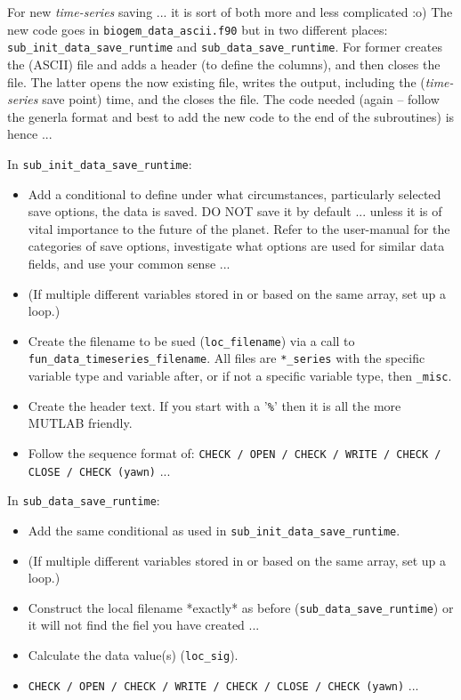 \documentclass[11pt,fleqn]{book} %
\begin{document}
For new \textit{time-series} saving ... it is sort of both more and less complicated :o) The new code goes in \texttt{biogem\_data\_ascii.f90} but in two different places: \texttt{sub\_init\_data\_save\_runtime} and \texttt{sub\_data\_save\_runtime}. For former creates the (ASCII) file and adds a header (to define the columns), and then closes the file. The latter opens the now existing file, writes the output, including the (\textit{time-series} save point) time, and the closes the file. The code needed (again -- follow the generla format and best to add the new code to the end of the subroutines) is hence ...

\noindent In \texttt{sub\_init\_data\_save\_runtime}:
\begin{itemize}[noitemsep]
\item Add a conditional to define under what circumstances, particularly selected save options, the data is saved. DO NOT save it by default ... unless it is of vital importance to the future of the planet. Refer to the user-manual for the categories of save options, investigate what options are used for similar data fields, and use your common sense ...
\item (If multiple different variables stored in or based on the same array, set up a loop.) 
\item Create the filename to be sued (\texttt{loc\_filename}) via a call to \texttt{fun\_data\_timeseries\_filename}. All files are \texttt{*\_series} with the specific variable type and variable after, or if not a specific variable type, then \texttt{\_misc}.
\item Create the header text. If you start with a '\texttt{\%}' then it is all the more MUTLAB friendly.
\item Follow the sequence format of: \texttt{CHECK / OPEN / CHECK / WRITE / CHECK / CLOSE / CHECK (yawn)} ...
\end{itemize}
\noindent In  \texttt{sub\_data\_save\_runtime}:
\begin{itemize}[noitemsep]
\item Add the same conditional as used in \texttt{sub\_init\_data\_save\_runtime}. \item (If multiple different variables stored in or based on the same array, set up a loop.) 
\item Construct the local filename *exactly* as before (\texttt{sub\_data\_save\_runtime}) or it will not find the fiel you have created ...
\item Calculate the data value(s) (\texttt{loc\_sig}).
\item  \texttt{CHECK / OPEN / CHECK / WRITE / CHECK / CLOSE / CHECK (yawn)} ...
\end{itemize}
\end{document}
